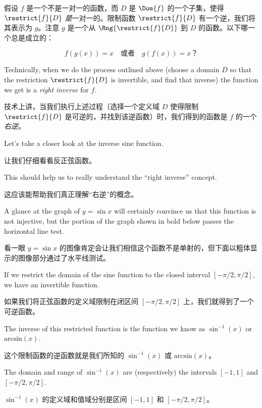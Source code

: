 \begin{exer}
假设 $f$ 是一个不是一对一的函数，而 $D$ 是 $\Dom{f}$ 的一个子集，使得 $\restrict{f}{D}$ \emph{是}一对一的。限制函数 $\restrict{f}{D}$ 有一个逆，我们将其表示为 $g$。注意 $g$ 是一个从 $\Rng{\restrict{f}{D}}$ 到 $D$ 的函数。以下哪一个总是成立的：

\[ f(g(x)) = x \quad \mbox{或者} \quad g(f(x)) = x ？ \]
\end{exer}

Technically, when we do the process outlined above (choose a domain
$D$ so that the restriction $\restrict{f}{D}$ is invertible, and 
find that inverse)
the function we get is a \emph{right inverse} for $f$.

技术上讲，当我们执行上述过程（选择一个定义域 $D$ 使得限制 $\restrict{f}{D}$ 是可逆的，并找到该逆函数）时，我们得到的函数是 $f$ 的一个 \emph{右逆}。

Let's take a closer look at the inverse sine function.

让我们仔细看看反正弦函数。

This should 
help us to really understand the ``right inverse'' concept.

这应该能帮助我们真正理解“右逆”的概念。

A glance at the graph of $y = \sin{x}$ will certainly convince us that 
this function is not injective, but the portion of the graph shown 
in bold below passes the horizontal line test.

看一眼 $y = \sin{x}$ 的图像肯定会让我们相信这个函数不是单射的，但下面以粗体显示的图像部分通过了水平线测试。

\begin{center}

\end{center}

If we restrict the domain of the sine function to the closed interval 
$[-\pi/2, \pi/2]$, we have an invertible function.

如果我们将正弦函数的定义域限制在闭区间 $[-\pi/2, \pi/2]$ 上，我们就得到了一个可逆函数。

The inverse of this
restricted function is the function we know as $\sin^{-1}(x)$ or 
$\mbox{arcsin}(x)$.

这个限制函数的逆函数就是我们所知的 $\sin^{-1}(x)$ 或 $\mbox{arcsin}(x)$。

The domain and range of $\sin^{-1}(x)$ are 
(respectively) the intervals
$[-1,1]$ and $[-\pi/2, \pi/2]$.

$\sin^{-1}(x)$ 的定义域和值域分别是区间 $[-1,1]$ 和 $[-\pi/2, \pi/2]$。

